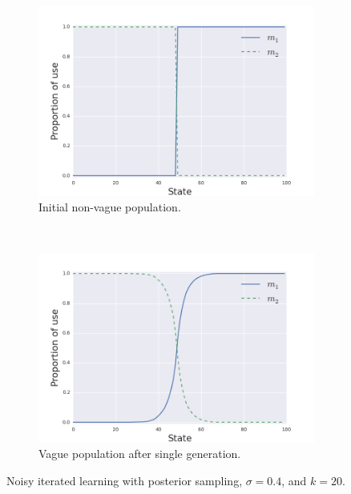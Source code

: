 \documentclass[10pt,a4paper]{article}
\begin{document}
\begin{figure}[ht]
  \centering
  \begin{subfigure}[b]{0.45\textwidth}
    \includegraphics[scale=0.4]{../code/plots/vag-gen0.png}
    \caption{Initial non-vague population.}
    \label{fig:vaga}
  \end{subfigure}
  ~
   \begin{subfigure}[b]{0.45\textwidth}
    \includegraphics[scale=0.4]{../code/plots/vag-gen1.png}
    \caption{Vague population after single generation.}
    \label{fig:vagb}

  \end{subfigure}
  \caption{Noisy iterated learning with posterior sampling, $\sigma = 0.4$, and $k = 20$.}
  \label{fig:vag}
\end{figure}
 
\end{document}
